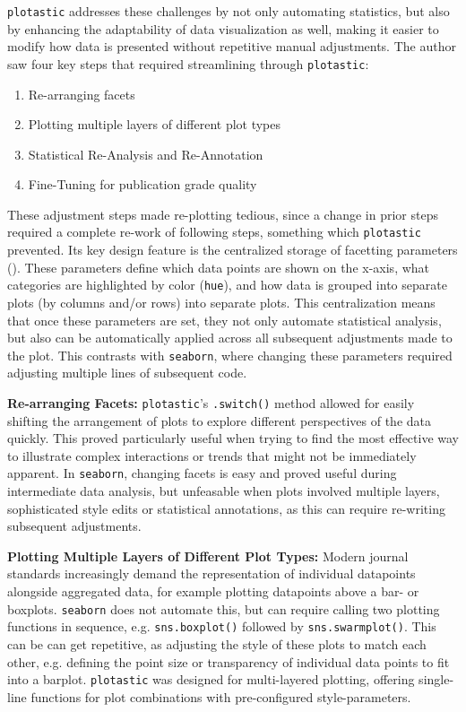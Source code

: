 \texttt{plotastic} addresses these challenges by not only automating statistics,
but also by enhancing the adaptability of data visualization as well, making it
easier to modify how data is presented without repetitive manual adjustments.
The author saw four key steps that required streamlining through \texttt{plotastic}:
\begin{enumerate}
    \item {Re-arranging facets}
    \item {Plotting multiple layers of different plot types}
    \item {Statistical Re-Analysis and Re-Annotation}
    \item {Fine-Tuning for publication grade quality}
\end{enumerate}

These adjustment steps made re-plotting tedious, since a change in prior steps
required a complete re-work of following steps, something which
\texttt{plotastic} prevented. Its key design feature is the centralized
storage of facetting parameters (\facetparams). These parameters define which
data points are shown on the x-axis, what categories are highlighted by color
(\texttt{hue}), and how data is grouped into separate plots (by columns and/or
rows) into separate plots. This centralization means that once these parameters
are set, they not only automate statistical analysis, but also can be
automatically applied across all subsequent adjustments made to the plot. This
contrasts with \texttt{seaborn}, where changing these parameters
required adjusting multiple lines of subsequent code.

\textbf{Re-arranging Facets:} \texttt{plotastic}'s \texttt{.switch()} method
allowed for easily shifting the arrangement of plots  to explore different perspectives of the data quickly. This proved
particularly useful when trying to find the most effective way to illustrate
complex interactions or trends that might not be immediately apparent. In
\texttt{seaborn}, changing facets is easy and proved useful during
intermediate data analysis, but unfeasable when plots involved multiple
layers, sophisticated style edits or statistical annotations, as this can
require re-writing subsequent adjustments.


\textbf{Plotting Multiple Layers of Different Plot Types:}
Modern journal standards increasingly demand the representation of individual
datapoints alongside aggregated data, for example plotting datapoints above a
bar- or boxplots. \texttt{seaborn} does not automate this, but can require
calling two plotting functions in sequence, e.g. \texttt{sns.boxplot()} followed
by \texttt{sns.swarmplot()}. This can be can get repetitive, as adjusting the
style of these plots to match each other, e.g. defining the point
    size or transparency of individual data points to fit into a barplot.
\texttt{plotastic} was designed for multi-layered plotting, offering single-line
functions for plot combinations with pre-configured style-parameters.

